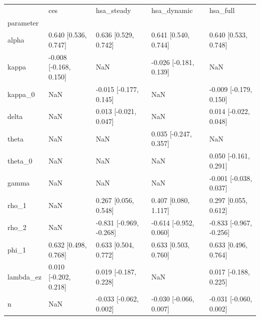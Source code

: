 \begin{tabular}{lllll}
\toprule
 & ces & hsa\_steady & hsa\_dynamic & hsa\_full \\
parameter &  &  &  &  \\
\midrule
alpha & 0.640 [0.536, 0.747] & 0.636 [0.529, 0.742] & 0.641 [0.540, 0.744] & 0.640 [0.533, 0.748] \\
kappa & -0.008 [-0.168, 0.150] & NaN & -0.026 [-0.181, 0.139] & NaN \\
kappa\_0 & NaN & -0.015 [-0.177, 0.145] & NaN & -0.009 [-0.179, 0.150] \\
delta & NaN & 0.013 [-0.021, 0.047] & NaN & 0.014 [-0.022, 0.048] \\
theta & NaN & NaN & 0.035 [-0.247, 0.357] & NaN \\
theta\_0 & NaN & NaN & NaN & 0.050 [-0.161, 0.291] \\
gamma & NaN & NaN & NaN & -0.001 [-0.038, 0.037] \\
rho\_1 & NaN & 0.267 [0.056, 0.548] & 0.407 [0.080, 1.117] & 0.297 [0.055, 0.612] \\
rho\_2 & NaN & -0.831 [-0.969, -0.268] & -0.614 [-0.952, 0.060] & -0.833 [-0.967, -0.256] \\
phi\_1 & 0.632 [0.498, 0.768] & 0.633 [0.504, 0.772] & 0.633 [0.503, 0.760] & 0.633 [0.496, 0.764] \\
lambda\_ez & 0.010 [-0.202, 0.218] & 0.019 [-0.187, 0.228] & NaN & 0.017 [-0.188, 0.225] \\
n & NaN & -0.033 [-0.062, 0.002] & -0.030 [-0.066, 0.007] & -0.031 [-0.060, 0.002] \\
\bottomrule
\end{tabular}
